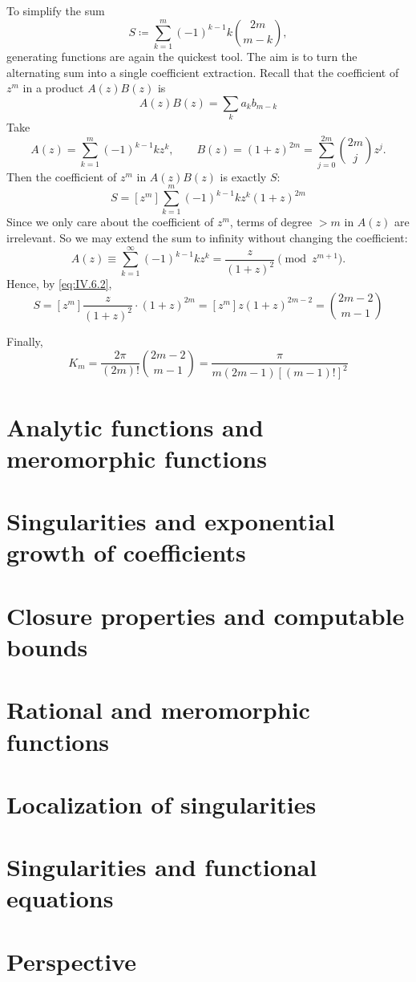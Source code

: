 To simplify the sum
\begin{equation*}
    S \coloneqq \sum_{k = 1}^{m}(-1)^{k - 1}k \binom{2m}{m - k},
\end{equation*}
generating functions are again the quickest tool. The aim is to turn the alternating sum into a single coefficient extraction. Recall that the coefficient of $z^{m}$ in a product $A(z)B(z)$ is
\begin{equation*}
    [z^{m}] A(z)B(z) = \sum_{k} a_{k}b_{m - k}
\end{equation*}
Take
\begin{equation*}
    A(z) = \sum_{k = 1}^{m}(-1)^{k - 1}kz^{k},
    \qquad
    B(z) = (1 + z)^{2m} = \sum_{j = 0}^{2m} \binom{2m}{j} z^{j}.
\end{equation*}
Then the coefficient of $z^{m}$ in $A(z)B(z)$ is exactly $S$:
\begin{equation} \label{eq:IV.6.2}
    S = [z^{m}] \sum_{k = 1}^{m}(-1)^{k - 1}kz^{k}(1 + z)^{2m}
\end{equation}
Since we only care about the coefficient of $z^{m}$, terms of degree $> m$ in $A(z)$ are irrelevant. So we may extend the sum to infinity without changing the coefficient:
\begin{equation*}
    A(z) \equiv \sum_{k = 1}^{\infty}(-1)^{k - 1}kz^{k} = \frac{z}{(1 + z)^{2}} \pmod{z^{m + 1}}.
\end{equation*}
Hence, by \eqref{eq:IV.6.2},
\begin{equation*}
    S = [z^{m}] \frac{z}{(1 + z)^{2}} \cdot (1 + z)^{2m} = [z^{m}] z(1 + z)^{2m - 2} = \binom{2m - 2}{m - 1}
\end{equation*}

Finally,
\begin{equation} \label{eq:IV.6.3}
    K_{m} = \frac{2\pi}{(2m)!} \binom{2m - 2}{m - 1} = \frac{\pi}{m(2m - 1)[(m - 1)!]^{2}}
\end{equation}

\section{Analytic functions and meromorphic functions}

\section{Singularities and exponential growth of coefficients}

\section{Closure properties and computable bounds}

\section{Rational and meromorphic functions}

\section{Localization of singularities}

\section{Singularities and functional equations}

\section{Perspective}
